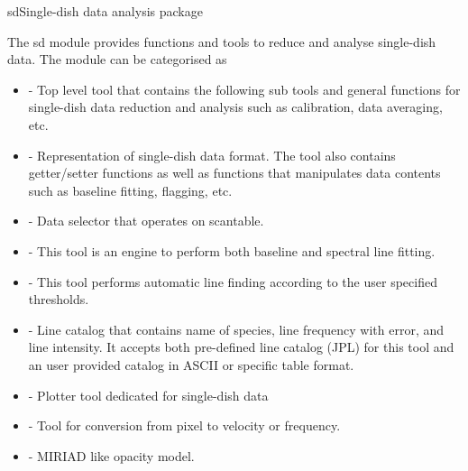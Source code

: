 \begin{ahmodule}{sd}{Single-dish data analysis package}

\begin{ahdescription}

The sd module provides functions and tools to reduce and analyse 
single-dish data. 
The module can be categorised as 

\begin{itemize}

\item {} - Top level tool that contains the following sub 
tools and general functions for single-dish data reduction 
and analysis such as calibration, data averaging, etc. 

\item {} - Representation of single-dish data 
format. The tool also contains getter/setter functions as well as functions 
that manipulates data contents such as baseline fitting, flagging, etc. 

\item {} - Data selector that operates on 
scantable.

\item {} - This tool is an engine to perform both 
baseline and spectral line fitting.

\item {} - This tool performs automatic 
line finding according to the user specified thresholds.

\item {} - Line catalog that contains name of species, 
line frequency with error, and line intensity. 
It accepts both pre-defined line catalog (JPL) for this tool and an user provided 
catalog in ASCII or specific table format.

\item {} - Plotter tool dedicated for 
single-dish data


\item {} - Tool for conversion from pixel to 
velocity or frequency.


\item {} - MIRIAD like opacity model.

\end{itemize}


\end{ahdescription}

\ahobjs{}
\ahfuncs{}



\end{ahmodule}
